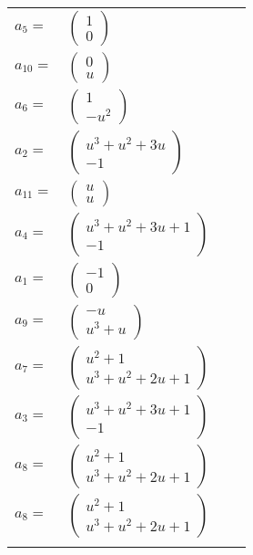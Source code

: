 \documentclass[1p]{elsarticle_modified}
\theoremstyle{definition}
\begin{document}
\begin{tabular}{m{7pt} m{180pt} m{7pt} m{180pt} }
\flushright $a_{5}=$&$\begin{pmatrix}1\\0\end{pmatrix}$ \\
\flushright $a_{10}=$&$\begin{pmatrix}0\\u\end{pmatrix}$ \\
\flushright $a_{6}=$&$\begin{pmatrix}1\\- u^2\end{pmatrix}$ \\
\flushright $a_{2}=$&$\begin{pmatrix}u^3+u^2+3 u\\-1\end{pmatrix}$ \\
\flushright $a_{11}=$&$\begin{pmatrix}u\\u\end{pmatrix}$ \\
\flushright $a_{4}=$&$\begin{pmatrix}u^3+u^2+3 u+1\\-1\end{pmatrix}$ \\
\flushright $a_{1}=$&$\begin{pmatrix}-1\\0\end{pmatrix}$ \\
\flushright $a_{9}=$&$\begin{pmatrix}- u\\u^3+u\end{pmatrix}$ \\
\flushright $a_{7}=$&$\begin{pmatrix}u^2+1\\u^3+u^2+2 u+1\end{pmatrix}$ \\
\flushright $a_{3}=$&$\begin{pmatrix}u^3+u^2+3 u+1\\-1\end{pmatrix}$ \\
\flushright $a_{8}=$&$\begin{pmatrix}u^2+1\\u^3+u^2+2 u+1\end{pmatrix}$\\ \flushright $a_{8}=$&$\begin{pmatrix}u^2+1\\u^3+u^2+2 u+1\end{pmatrix}$\\&\end{tabular}
\end{document}
